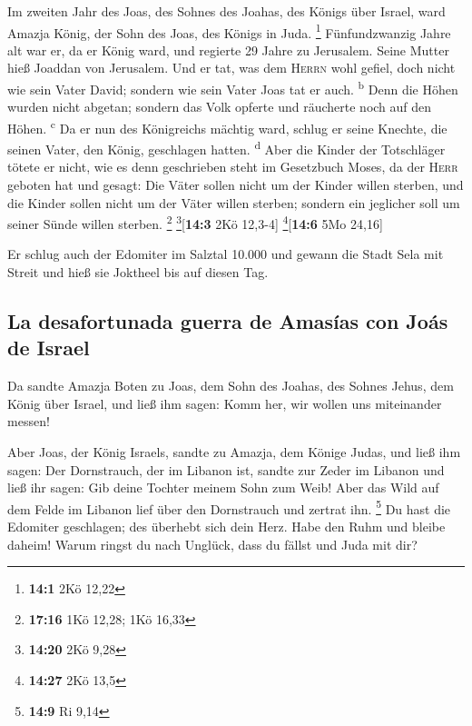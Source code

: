  Im zweiten Jahr des Joas, des Sohnes des Joahas, des
Königs über Israel, ward Amazja König, der Sohn des Joas, des Königs in
Juda. \footnote{\textbf{14:1} 2Kö 12,22}  Fünfundzwanzig
Jahre alt war er, da er König ward, und regierte 29 Jahre zu Jerusalem.
Seine Mutter hieß Joaddan von Jerusalem.  Und er tat, was
dem \textsc{Herrn} wohl gefiel, doch nicht wie sein Vater David; sondern
wie sein Vater Joas tat er auch. \textsuperscript{b}  Denn
die Höhen wurden nicht abgetan; sondern das Volk opferte und räucherte
noch auf den Höhen. \textsuperscript{c}  Da er nun des
Königreichs mächtig ward, schlug er seine Knechte, die seinen Vater, den
König, geschlagen hatten. \textsuperscript{d}  Aber die
Kinder der Totschläger tötete er nicht, wie es denn geschrieben steht im
Gesetzbuch Moses, da der \textsc{Herr} geboten hat und gesagt: Die Väter
sollen nicht um der Kinder willen sterben, und die Kinder sollen nicht
um der Väter willen sterben; sondern ein jeglicher soll um seiner Sünde
willen sterben. \footnote{\textbf{17:16} 1Kö 12,28; 1Kö 16,33}
\footnote{\textbf{14:20} 2Kö 9,28}{[}\textbf{14:3} 2Kö 12,3-4{]}
\footnote{\textbf{14:27} 2Kö 13,5}{[}\textbf{14:6} 5Mo 24,16{]}

 Er schlug auch der Edomiter im Salztal 10.000 und gewann
die Stadt Sela mit Streit und hieß sie Joktheel bis auf diesen Tag.

\hypertarget{la-desafortunada-guerra-de-amasuxedas-con-jouxe1s-de-israel}{%
\subsection{La desafortunada guerra de Amasías con Joás de
Israel}\label{la-desafortunada-guerra-de-amasuxedas-con-jouxe1s-de-israel}}

 Da sandte Amazja Boten zu Joas, dem Sohn des Joahas, des
Sohnes Jehus, dem König über Israel, und ließ ihm sagen: Komm her, wir
wollen uns miteinander messen!

 Aber Joas, der König Israels, sandte zu Amazja, dem
Könige Judas, und ließ ihm sagen: Der Dornstrauch, der im Libanon ist,
sandte zur Zeder im Libanon und ließ ihr sagen: Gib deine Tochter meinem
Sohn zum Weib! Aber das Wild auf dem Felde im Libanon lief über den
Dornstrauch und zertrat ihn. \footnote{\textbf{14:9} Ri 9,14}
 Du hast die Edomiter geschlagen; des überhebt sich dein
Herz. Habe den Ruhm und bleibe daheim! Warum ringst du nach Unglück,
dass du fällst und Juda mit dir?

